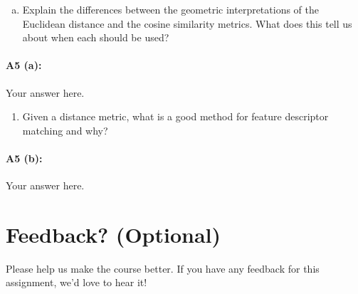 \begin{enumerate}[(a)]
    \item Explain the differences between the geometric interpretations of the Euclidean distance and the cosine similarity metrics. What does this tell us about when each should be used?
\end{enumerate}

\paragraph{A5 (a):} Your answer here.





\pagebreak
\begin{enumerate}[resume*]
    \item Given a distance metric, what is a good method for feature descriptor matching and why?
\end{enumerate}

\paragraph{A5 (b):} Your answer here.








\pagebreak
\section*{Feedback? (Optional)}
Please help us make the course better. If you have any feedback for this assignment, we'd love to hear it!






